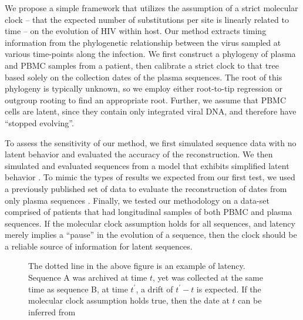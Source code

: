 We propose a simple framework that utilizes the assumption of a strict molecular clock -- that the expected number of substitutions per site is linearly related to time \citep{Ho14} --  on the evolution of HIV within host. 
Our method extracts timing information from the phylogenetic relationship between the virus sampled at various time-points along the infection. 
We first construct a phylogeny of plasma and PBMC samples from a patient, then calibrate a strict clock to that tree based solely on the collection dates of the plasma sequences. The root of this phylogeny is typically unknown, so we employ either root-to-tip regression or outgroup rooting to find an appropriate root. 
Further, we assume that PBMC cells are latent, since they contain only integrated viral DNA, and therefore have ``stopped evolving''.

To assess the sensitivity of our method, we first simulated sequence data with no latent behavior and evaluated the accuracy of the reconstruction. 
We then simulated and evaluated sequences from a model that exhibits simplified latent behavior \citep{Immonen14}. To mimic the types of results we expected from our first test, we used a previously published set of data to evaluate the reconstruction of dates from only plasma sequences \citep{McCloskey14}. Finally, we tested our methodology on a data-set comprised of patients that had longitudinal samples of both PBMC and plasma sequences. 
If the molecular clock assumption holds for all sequences, and latency merely implies a ``pause'' in the evolution of a sequence, then the clock should be a reliable source of information for latent sequences.

\begin{figure} \label{fig:latenttree}
	\centering
	\scalebox{5}{}
	\caption[Example of latent behavior]{The dotted line in the above figure is an example of latency. 
	Sequence A was archived at time $t$, yet was collected at the same time as sequence B, at time $t^\prime$, a drift of $t^\prime - t$ is expected. 
	If the molecular clock assumption holds true, then the date at $t$ can be inferred from }
\end{figure}
